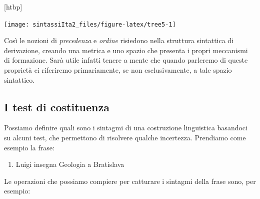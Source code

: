 \documentclass[
  a4paper,
  twoside,
  11pt,
  chapterprefix=false,
  bibliography=totocnumbered,
  listof=flat]{scrbook}
\makeatletter
\providecommand{\tightlist}{%
  \setlength{\itemsep}{0pt}\setlength{\parskip}{0pt}}
\def\fps@figure{htbp}
\renewenvironment{figure}[1][\fps@figure]{
  \edef\@tempa{\noexpand\@float{figure}[#1]} 
  \@tempa
  \sffamily
}{
  \end@float
}
\makeatother
\begin{document}
\begin{figure}

{\centering \texttt{[image: sintassiIta2\_files/figure-latex/tree5-1]} 

}

\caption{Una semplice derivazione sintattica}\label{fig:tree5}
\end{figure}

Così le nozioni di \emph{precedenza} e \emph{ordine} risiedono nella struttura sintattica di derivazione, creando una metrica e uno spazio che presenta i propri meccanismi di formazione. Sarà utile infatti tenere a mente che quando parleremo di queste proprietà ci riferiremo primariamente, se non esclusivamente, a tale spazio sintattico.

\hypertarget{i-test-di-costituenza}{%
\subsection{I test di costituenza}\label{i-test-di-costituenza}}

Possiamo definire quali sono i sintagmi di una costruzione linguistica basandoci su alcuni test, che permettono di risolvere qualche incertezza. Prendiamo come esempio la frase:

\begin{enumerate}
\def\labelenumi{(\arabic{enumi})}
\setcounter{enumi}{10}
\tightlist
\item
  Luigi insegna Geologia a Bratislava
\end{enumerate}

Le operazioni che possiamo compiere per catturare i sintagmi della frase sono, per esempio:
\end{document}
